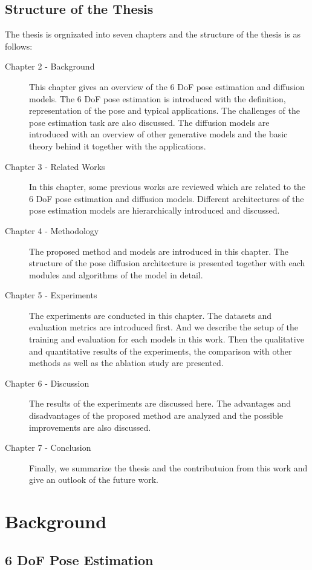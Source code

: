 \documentclass[12pt,DIV14,BCOR12mm,a4paper,footinclude=false,headinclude,parskip=half-,twoside,openright,cleardoublepage=empty,toc=index,bibliography=totoc,listof=totoc]{scrreprt}
\numberwithin{equation}{chapter}
\begin{document}
\section{Structure of the Thesis}
The thesis is orgnizated into seven chapters and the structure of the thesis is as follows:
\begin{description}
  \item[Chapter 2 - Background] This chapter gives an overview of the 6 DoF pose estimation and diffusion models. The 6 DoF pose estimation is introduced with the definition, representation of the pose and typical applications. The challenges of the pose estimation task are also discussed. The diffusion models are introduced with an overview of other generative models and the basic theory behind it together with the applications.
  \item[Chapter 3 - Related Works] In this chapter, some previous works are reviewed which are related to the 6 DoF pose estimation and diffusion models. Different architectures of the pose estimation models are hierarchically introduced and discussed.
  \item[Chapter 4 - Methodology] The proposed method and models are introduced in this chapter. The structure of the pose diffusion architecture is presented together with each modules and algorithms of the model in detail.
  \item[Chapter 5 - Experiments] The experiments are conducted in this chapter. The datasets and evaluation metrics are introduced first. And we describe the setup of the training and evaluation for each models in this work. Then the qualitative and quantitative results of the experiments, the comparison with other methods as well as the ablation study are presented.
  \item[Chapter 6 - Discussion] The results of the experiments are discussed here. The advantages and disadvantages of the proposed method are analyzed and the possible improvements are also discussed.
  \item[Chapter 7 - Conclusion ] Finally, we summarize the thesis and the contributuion from this work and give an outlook of the future work.
\end{description} 

\chapter{Background}
\section{6 DoF Pose Estimation}
\end{document}
